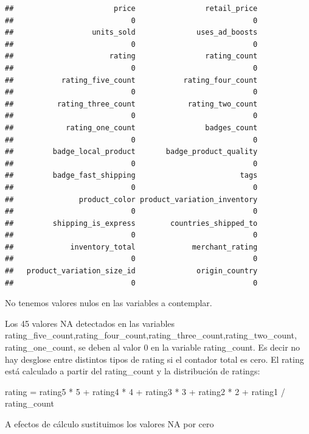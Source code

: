 \documentclass[
]{article}
\begin{document}
\begin{verbatim}
##                       price                retail_price 
##                           0                           0 
##                  units_sold              uses_ad_boosts 
##                           0                           0 
##                      rating                rating_count 
##                           0                           0 
##           rating_five_count           rating_four_count 
##                           0                           0 
##          rating_three_count            rating_two_count 
##                           0                           0 
##            rating_one_count                badges_count 
##                           0                           0 
##         badge_local_product       badge_product_quality 
##                           0                           0 
##         badge_fast_shipping                        tags 
##                           0                           0 
##               product_color product_variation_inventory 
##                           0                           0 
##         shipping_is_express        countries_shipped_to 
##                           0                           0 
##             inventory_total             merchant_rating 
##                           0                           0 
##   product_variation_size_id              origin_country 
##                           0                           0
\end{verbatim}

No tenemos valores nulos en las variables a contemplar.

Los 45 valores NA detectados en las variables
rating\_five\_count,rating\_four\_count,rating\_three\_count,rating\_two\_count,
rating\_one\_count, se deben al valor 0 en la variable rating\_count. Es
decir no hay desglose entre distintos tipos de rating si el contador
total es cero. El rating está calculado a partir del rating\_count y la
distribución de ratings:

rating = rating5 * 5 + rating4 * 4 + rating3 * 3 + rating2 * 2 + rating1
/ rating\_count

A efectos de cálculo sustituimos los valores NA por cero
\end{document}
